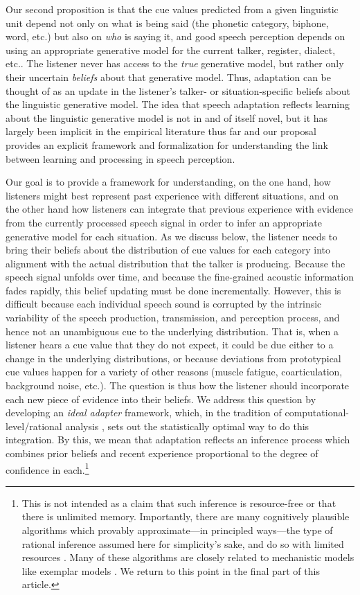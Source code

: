 \label{r1-cues-depend-who}
Our second proposition is that the cue values predicted from a given linguistic unit depend not only on what is being said (the phonetic category, biphone, word, etc.) but also on \emph{who} is saying it, and good speech perception depends on using an appropriate generative model for the current talker, register, dialect, etc..  The listener never has access to the \emph{true} generative model, but rather only their uncertain \emph{beliefs} about that generative model.  Thus, adaptation can be thought of as an update in the listener's talker- or situation-specific beliefs about the linguistic generative model.  The idea that speech adaptation reflects learning about the linguistic generative model is not in and of itself novel, but it has largely been implicit in the empirical literature thus far and our proposal provides an explicit framework and formalization for understanding the link between learning and processing in speech perception.

Our goal is to provide a framework for understanding, on the one hand, how listeners might best represent past experience with different situations, and on the other hand how listeners can integrate that previous experience with evidence from the currently processed speech signal in order to infer an appropriate generative model for each situation.  As we discuss below, the listener needs to bring their beliefs about the distribution of cue values for each category into alignment with the actual distribution that the talker is producing.  Because the speech signal unfolds over time, and because the fine-grained acoustic information fades rapidly, this belief updating must be done incrementally. However, this is difficult because each individual speech sound is corrupted by the intrinsic variability
of the speech production, transmission, and perception process, and hence not an unambiguous cue to the underlying distribution.  That is, when a listener hears a cue value that they do not expect, it could be due either to a change in the underlying distributions,
or because deviations from prototypical cue values happen for a variety of other reasons (muscle fatigue, coarticulation, background noise, etc.).  The question is thus how the listener should incorporate each new piece of evidence into their beliefs.  We address this question by developing an \emph{ideal adapter} framework, which, in the tradition of computational-level/rational analysis \autocite{Anderson1990,Marr1982}, sets out the statistically optimal way to do this integration. By this, we mean that adaptation reflects an inference process which combines prior beliefs and recent experience proportional to the degree of confidence in each.\footnote{This is not intended as a claim that such inference is resource-free or that there is unlimited memory. Importantly, there are many cognitively plausible algorithms which provably approximate---in principled ways---the type of rational inference assumed here for simplicity's sake, and do so with limited resources \autocite[e.g.,][]{Sanborn2010}. Many of these algorithms are closely related to mechanistic models like exemplar models \protect\autocite[see][]{Gibson2013,Shi2010}. We return to this point in the final part of this article.}


